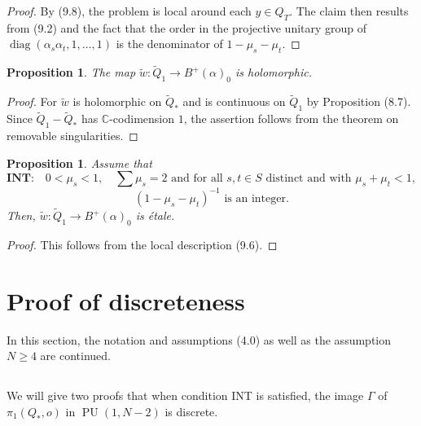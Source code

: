 \documentclass[12pt,a4paper]{article}
\theoremstyle{plain}
\newtheorem{proposition}[theorem]{Proposition}
\theoremstyle{definition}
\theoremstyle{remark}
\DeclareMathOperator{\diag}{diag}
\DeclareMathOperator{\PU}{PU}
\begin{document}
\begin{proof}
By (9.8), the problem is local around each $y \in Q_T$. The claim then results from (9.2) and the fact that the order in the projective unitary group of $\diag(\alpha_s \alpha_t, 1, \ldots, 1)$ is the denominator of $1 - \mu_s - \mu_t$.
\end{proof}

\begin{proposition}
\label{9.11}
The map $\widetilde{w} : \widetilde{Q}_1 \to B^+(\alpha)_0$ is holomorphic.
\end{proposition}

\begin{proof}
For $\widetilde{w}$ is holomorphic on $\widetilde{Q}_*$ and is continuous on $\widetilde{Q}_1$ by Proposition (8.7). Since $\widetilde{Q}_1 - \widetilde{Q}_*$ has $\mathbb{C}$-codimension $1$, the assertion follows from the theorem on removable singularities.
\end{proof}

\begin{proposition}
\label{9.12}
Assume that
\[
\textbf{INT:} \quad 0 < \mu_s < 1, \quad \sum \mu_s = 2 \text{ and for all } s, t \in S \text{ distinct and with } \mu_s + \mu_t < 1,
\]
\[
(1 - \mu_s - \mu_t)^{-1} \text{ is an integer}.
\]
Then, $\widetilde{w} : \widetilde{Q}_1 \to B^+(\alpha)_0$ is \'etale.
\end{proposition}

\begin{proof}
This follows from the local description (9.6).
\end{proof}

\section{Proof of discreteness}
\label{sec:10}

In this section, the notation and assumptions (4.0) as well as the assumption $N \geqslant 4$ are continued.

\subsection{}
\label{10.1}

We will give two proofs that when condition INT is satisfied, the image $\Gamma$ of $\pi_1(Q_*, o)$ in $\PU(1, N - 2)$ is discrete.

\subsection{}
\label{10.2}
\end{document}
